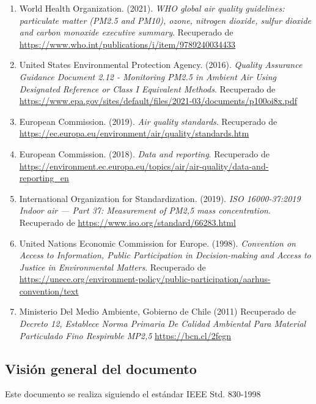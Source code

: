 \documentclass[
11pt, %
codirector, %
]{charter}
\begin{document}

\begin{enumerate}
	\item World Health Organization. (2021). \textit{WHO global air quality guidelines: particulate matter (PM2.5 and PM10), ozone, nitrogen dioxide, sulfur dioxide and carbon monoxide executive summary}. Recuperado de \url{https://www.who.int/publications/i/item/9789240034433}
	\item United States Environmental Protection Agency. (2016). \textit{Quality Assurance Guidance
		Document 2.12 - Monitoring PM2.5 in Ambient Air Using Designated Reference or
	Class I Equivalent Methods}. Recuperado de \url{https://www.epa.gov/sites/default/files/2021-03/documents/p100oi8x.pdf}
	\item European Commission. (2019). \textit{Air quality standards}. Recuperado de \url{https://ec.europa.eu/environment/air/quality/standards.htm}
	\item European Commission. (2018). \textit{Data and reporting}. Recuperado de
	\url{https://environment.ec.europa.eu/topics/air/air-quality/data-and-reporting_en}
	\item International Organization for Standardization. (2019). \textit{ISO 16000-37:2019 Indoor air — Part 37: Measurement of PM2,5 mass concentration}. Recuperado de \url{https://www.iso.org/standard/66283.html}
	\item United Nations Economic Commission for Europe. (1998). \textit{Convention on Access to Information, Public Participation in Decision-making and Access to Justice in Environmental Matters}. Recuperado de \url{https://unece.org/environment-policy/public-participation/aarhus-convention/text}
	\item Ministerio Del Medio Ambiente, Gobierno de Chile (2011)
	Recuperado de
	\textit{Decreto 12, Establece Norma Primaria De Calidad Ambiental Para Material Particulado Fino Respirable MP2,5} 
	\url{https://bcn.cl/2fegn}
\end{enumerate}


\subsection{Visión general del documento}
\label{sec:orgdaca22c}

Este documento se realiza siguiendo el estándar IEEE Std. 830-1998
\end{document}
